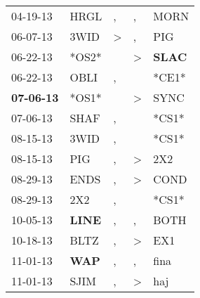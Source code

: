 \begin{supertabular}{p{0.07\textwidth}p{0.06\textwidth}p{0.02\textwidth}p{0.02\textwidth}p{0.06\textwidth}}
          04-19-13\textsuperscript{} &           HRGL\textsuperscript{} &                , &                , &           MORN\textsuperscript{} \\
          06-07-13\textsuperscript{} &           3WID\textsuperscript{} &     \textgreater &                , &            PIG\textsuperscript{} \\
          06-22-13\textsuperscript{} &                            *OS2* &                  &     \textgreater &  \textbf{SLAC\textsuperscript{}} \\
          06-22-13\textsuperscript{} &           OBLI\textsuperscript{} &                , &                  &                            *CE1* \\
 \textbf{07-06-13\textsuperscript{}} &                            *OS1* &                  &     \textgreater &           SYNC\textsuperscript{} \\
          07-06-13\textsuperscript{} &           SHAF\textsuperscript{} &                , &                  &                            *CS1* \\
          08-15-13\textsuperscript{} &           3WID\textsuperscript{} &                , &                  &                            *CS1* \\
          08-15-13\textsuperscript{} &            PIG\textsuperscript{} &                , &     \textgreater &            2X2\textsuperscript{} \\
          08-29-13\textsuperscript{} &           ENDS\textsuperscript{} &                , &     \textgreater &           COND\textsuperscript{} \\
          08-29-13\textsuperscript{} &            2X2\textsuperscript{} &                , &                  &                            *CS1* \\
          10-05-13\textsuperscript{} &  \textbf{LINE\textsuperscript{}} &                , &                , &           BOTH\textsuperscript{} \\
          10-18-13\textsuperscript{} &           BLTZ\textsuperscript{} &                , &     \textgreater &            EX1\textsuperscript{} \\
          11-01-13\textsuperscript{} &   \textbf{WAP\textsuperscript{}} &                , &                , &           fina\textsuperscript{} \\
          11-01-13\textsuperscript{} &           SJIM\textsuperscript{} &                , &     \textgreater &            haj\textsuperscript{} \\

\end{supertabular}
